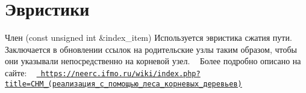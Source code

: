 \chapter{Эвристики}
\hypertarget{heur}{}\label{heur}

\begin{DoxyRefList}
\item[Член \doxylink{struct_d_s_f_a2acb9ab4bfa885e1ca3010d38655c588}{DSF\texorpdfstring{$<$}{<} type \texorpdfstring{$>$}{>}\+::get\+\_\+private} (const unsigned int \&index\+\_\+item)]\label{heur__heur000001}%
%
 Используется эвристика сжатия пути. ~\newline
Заключается в обновлении ссылок на родительские узлы таким образом, чтобы они указывали непосредственно на корневой узел. ~\newline
Более подробно описано на сайте\+: ~\newline
\href{https://neerc.ifmo.ru/wiki/index.php?title=\%D0\%A1\%D0\%9D\%D0\%9C_(\%D1\%80\%D0\%B5\%D0\%B0\%D0\%BB\%D0\%B8\%D0\%B7\%D0\%B0\%D1\%86\%D0\%B8\%D1\%8F_\%D1\%81_\%D0\%BF\%D0\%BE\%D0\%BC\%D0\%BE\%D1\%89\%D1\%8C\%D1\%8E_\%D0\%BB\%D0\%B5\%D1\%81\%D0\%B0_\%D0\%BA\%D0\%BE\%D1\%80\%D0\%BD\%D0\%B5\%D0\%B2\%D1\%8B\%D1\%85_\%D0\%B4\%D0\%B5\%D1\%80\%D0\%B5\%D0\%B2\%D1\%8C\%D0\%B5\%D0\%B2)}{\texttt{ https\+://neerc.\+ifmo.\+ru/wiki/index.\+php?title=СНМ\+\_\+(реализация\+\_\+с\+\_\+помощью\+\_\+леса\+\_\+корневых\+\_\+деревьев)}}
\end{DoxyRefList}